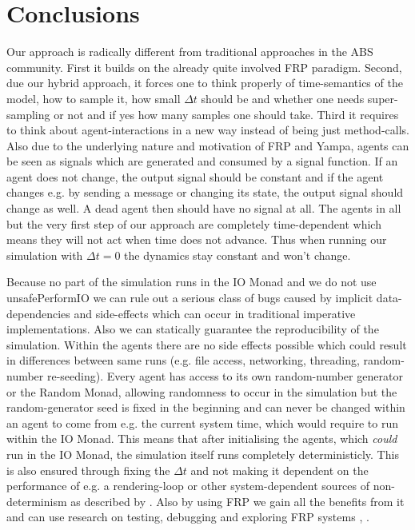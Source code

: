 \section{Conclusions}
Our approach is radically different from traditional approaches in the ABS community. First it builds on the already quite involved FRP paradigm. Second, due our hybrid approach, it forces one to think properly of time-semantics of the model, how to sample it, how small $\Delta t$ should be and whether one needs super-sampling or not and if yes how many samples one should take. Third it requires to think about agent-interactions in a new way instead of being just method-calls. Also due to the underlying nature and motivation of FRP and Yampa, agents can be seen as signals which are generated and consumed by a signal function. If an agent does not change, the output signal should be constant and if the agent changes e.g. by sending a message or changing its state, the output signal should change as well. A dead agent then should have no signal at all. The agents in all but the very first step of our approach are completely time-dependent which means they will not act when time does not advance. Thus when running our simulation with $\Delta t = 0$ the dynamics stay constant and won't change.

Because no part of the simulation runs in the IO Monad and we do not use unsafePerformIO we can rule out a serious class of bugs caused by implicit data-dependencies and side-effects which can occur in traditional imperative implementations. Also we can statically guarantee the reproducibility of the simulation. Within the agents there are no side effects possible which could result in differences between same runs (e.g. file access, networking, threading, random-number re-seeding). Every agent has access to its own random-number generator or the Random Monad, allowing randomness to occur in the simulation but the random-generator seed is fixed in the beginning and can never be changed within an agent to come from e.g. the current system time, which would require to run within the IO Monad. This means that after initialising the agents, which \textit{could} run in the IO Monad, the simulation itself runs completely deterministicly. This is also ensured through fixing the $\Delta t$ and not making it dependent on the performance of e.g. a rendering-loop or other system-dependent sources of non-determinism as described by \cite{perez_testing_2017}. Also by using FRP we gain all the benefits from it and can use research on testing, debugging and exploring FRP systems \cite{perez_testing_2017}, \cite{perez_back_2017}.

